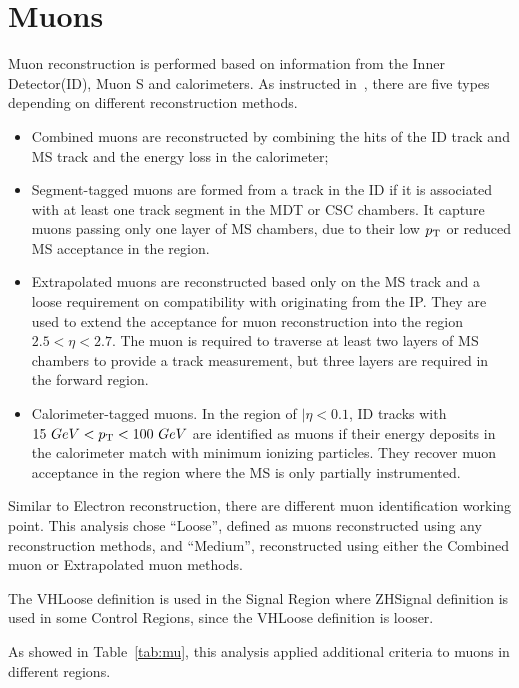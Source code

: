 \section{Muons}
\label{sec:mu}
\par Muon reconstruction is performed based on information from the Inner Detector(ID), Muon S and calorimeters. As instructed in~\cite{Aad:2016jkr}, 
there are five types depending on different reconstruction methods.

\begin{itemize}
\item Combined muons are reconstructed by combining the hits of the ID track and MS track and the energy loss in the calorimeter;
\item Segment-tagged muons are formed from a track in the ID if it is associated with at least one track segment in the MDT or CSC chambers. 
    It capture muons passing only one layer of MS chambers, due to their low $p_{\mathrm{T}}$ or reduced MS acceptance in the region.
\item Extrapolated muons are reconstructed based only on the MS track and a loose requirement on compatibility with originating from the IP. 
    They are used to extend the acceptance for muon reconstruction into the region $2.5 <\eta< 2.7$. 
        The muon is required to traverse at least two layers of MS chambers to provide a track measurement, but three layers are required in the forward region.

\item Calorimeter-tagged muons. In the region of $|\eta< 0.1$, ID tracks with $15 ~GeV < p_{\mathrm{T}} < 100 ~GeV$ are identified as muons if their energy deposits in the calorimeter 
    match with minimum ionizing particles. They recover muon acceptance in the region where the MS is only partially instrumented.

\end{itemize}
\par Similar to Electron reconstruction, there are different muon identification working point. This analysis chose ``Loose'', defined as muons reconstructed using any reconstruction methods, 
and ``Medium'', reconstructed using either the Combined muon or Extrapolated muon methods.
\par The VHLoose definition is used in the Signal Region where ZHSignal definition is used in some Control Regions, since the VHLoose definition is looser.					
\par As showed in Table~\ref{tab:mu}, this analysis applied additional criteria to muons in different regions. 
